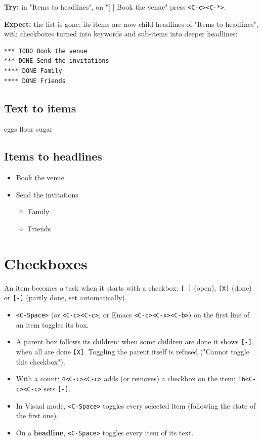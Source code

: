 \textbf{Try:} in "Items to headlines", on "[ ] Book the venue" press \texttt{<C-c><C-*>}.

\textbf{Expect:} the list is gone; its items are now child headlines of "Items to
headlines", with checkboxes turned into keywords and sub-items into deeper
headlines:
\begin{verbatim}
*** TODO Book the venue
*** DONE Send the invitations
**** DONE Family
**** DONE Friends
\end{verbatim}
\subsection{Text to items}
\label{sec:org38bae4b}
eggs
flour
sugar
\subsection{Items to headlines}
\label{sec:orgefbd59a}
\begin{itemize}
\item[{$\square$}] Book the venue
\item[{$\boxtimes$}] Send the invitations
\begin{itemize}
\item[{$\boxtimes$}] Family
\item[{$\boxtimes$}] Friends
\end{itemize}
\end{itemize}
\section{Checkboxes}
\label{sec:org80a4529}
An item becomes a task when it starts with a checkbox: \texttt{[ ]} (open),
\texttt{[X]} (done) or \texttt{[-]} (partly done, set automatically).

\begin{itemize}
\item \texttt{<C-Space>} (or \texttt{<C-c><C-c>}, or Emacs \texttt{<C-c><C-x><C-b>}) on the first
line of an item toggles its box.
\item A parent box follows its children: when some children are done it shows
\texttt{[-]}, when all are done \texttt{[X]}. Toggling the parent itself is refused
("Cannot toggle this checkbox").
\item With a count: \texttt{4<C-c><C-c>} adds (or removes) a checkbox on the item;
\texttt{16<C-c><C-c>} sets \texttt{[-]}.
\item In Visual mode, \texttt{<C-Space>} toggles every selected item (following the
state of the first one).
\item On a \textbf{headline}, \texttt{<C-Space>} toggles every item of its text.
\end{itemize}


